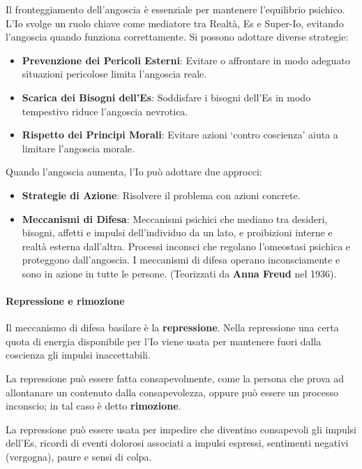\documentclass{subfiles}
\begin{document}
Il fronteggiamento dell'angoscia è essenziale per mantenere l'equilibrio psichico. 
L'Io svolge un ruolo chiave come mediatore tra Realtà, Es e Super-Io, evitando l'angoscia quando 
funziona correttamente. Si possono adottare diverse strategie: 

\begin{itemize}
    \item \textbf{Prevenzione dei Pericoli Esterni}: Evitare o affrontare in modo adeguato 
    situazioni pericolose limita l'angoscia reale.
    \item \textbf{Scarica dei Bisogni dell'Es}: Soddisfare i bisogni dell'Es in modo tempestivo 
    riduce l'angoscia nevrotica.
    \item \textbf{Rispetto dei Principi Morali}: Evitare azioni `contro coscienza' aiuta a 
    limitare l'angoscia morale.
\end{itemize}

Quando l'angoscia aumenta, l'Io può adottare due approcci: 

\begin{itemize}
    \item \textbf{Strategie di Azione}: Risolvere il problema con azioni concrete.
    \item \textbf{Meccanismi di Difesa}: Meccanismi psichici che mediano tra desideri, bisogni, 
    affetti e impulsi dell'individuo da un lato, e proibizioni interne e realtà esterna dall'altra. Processi inconsci che regolano l'omeostasi psichica e proteggono dall'angoscia. 
    I meccanismi di difesa operano inconsciamente e sono in azione in tutte le persone. 
    (Teorizzati da \textbf{Anna Freud} nel 1936).
\end{itemize}

\paragraph{Repressione e rimozione}
Il meccanismo di difesa basilare è la \textbf{repressione}. 
Nella repressione una certa quota di energia disponibile per l'Io viene usata per mantenere 
fuori dalla coscienza gli impulsi inaccettabili.

La repressione può essere fatta consapevolmente, come la persona che prova ad allontanare un 
contenuto dalla consapevolezza, oppure può essere un processo inconscio; in tal caso è detto 
\textbf{rimozione}.

La repressione può essere usata per impedire che diventino consapevoli gli impulsi 
dell'Es, ricordi di eventi dolorosi associati a impulsi espressi, sentimenti 
negativi (vergogna), paure e sensi di colpa. 
\end{document}
